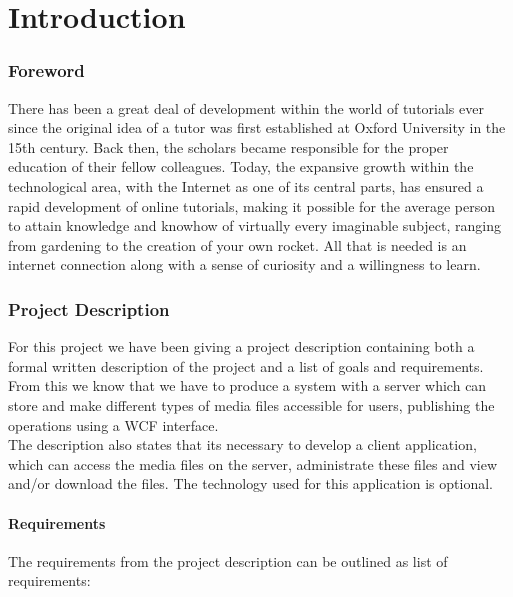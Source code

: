 \part{Introduction}
\section{Foreword}
There has been a great deal of development within the world of tutorials ever since the original idea of a tutor was first established at Oxford University in the 15th century. Back then, the scholars became responsible for the proper education of their fellow colleagues. Today, the expansive growth within the technological area, with the Internet as one of its central parts, has ensured a rapid development of online tutorials, making it possible for the average person to attain knowledge and knowhow of virtually every imaginable subject, ranging from gardening to the creation of your own rocket.
All that is needed is an internet connection along with a sense of curiosity and a willingness to learn.\\


\section{Project Description}
For this project we have been giving a project description containing both a formal written description of the project and a list of goals and requirements. From this we know that we have to produce a system with a server which can store and make different types of media files accessible for users, publishing the operations using a WCF interface.\\
The description also states that its necessary to develop a client application, which can access the media files on the server, administrate these files and view and/or download the files. The technology used for this application is optional.\\

\subsection{Requirements}
The requirements from the project description can be outlined as list of requirements:
